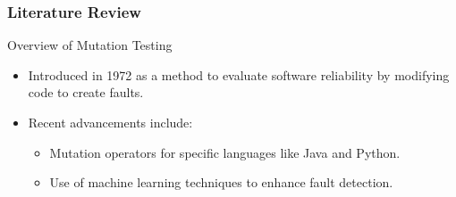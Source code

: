 \documentclass[12pt]{beamer}
\theoremstyle{remark}
\theoremstyle{definition}
\begin{document}
\begin{frame}[allowframebreaks]
\frametitle{Literature Review}
\begin{block}{Overview of Mutation Testing}
\begin{itemize}
    \item Introduced in 1972 as a method to evaluate software reliability by modifying code to create faults.
    \item Recent advancements include:
    \begin{itemize}
        \item Mutation operators for specific languages like Java and Python.
        \item Use of machine learning techniques to enhance fault detection.
    \end{itemize}
\end{itemize}
\end{block}


\end{frame}
\end{document}
